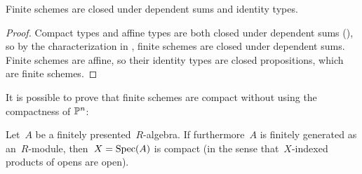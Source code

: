 \begin{lemma}
  Finite schemes are closed under dependent sums and identity types.
\end{lemma}

\begin{proof}
  Compact types and affine types are both closed under dependent sums (\cite[Lemma 2.0.3]{proper-draft}), so by the characterization in ,
  finite schemes are closed under dependent sums.
  Finite schemes are affine, so their identity types are closed propositions, which are finite schemes.
\end{proof}

It is possible to prove that finite schemes are compact without using the compactness of $\mathbb{P}^n$:

\begin{proposition}\label{finite-compact}
Let~$A$ be a finitely presented~$R$-algebra. If furthermore~$A$ is finitely
generated as an~$R$-module, then~$X = \operatorname{Spec}(A)$ is compact (in the sense
that~$X$-indexed products of opens are open).\end{proposition}

